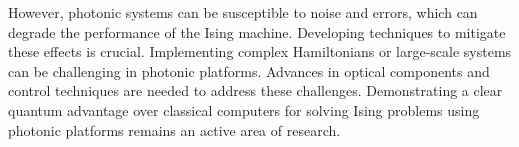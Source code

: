 However, photonic systems can be susceptible to noise and errors, which can degrade the performance of the Ising machine. Developing techniques to mitigate these effects is crucial. Implementing complex Hamiltonians or large-scale systems can be challenging in photonic platforms. Advances in optical components and control techniques are needed to address these challenges. Demonstrating a clear quantum advantage over classical computers for solving Ising problems using photonic platforms remains an active area of research.\\

\newpage

